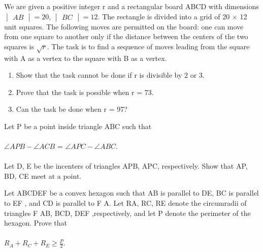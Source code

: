 \item We are given a positive integer r and a rectangular board ABCD with
dimensions $\begin{vmatrix} AB \end{vmatrix} = 20$, $\begin{vmatrix} BC \end{vmatrix} = 12$. The rectangle is divided into a grid of 20 $\times$ 12 unit squares. The following moves are permitted on the board: one can move from one square to another only if the distance between the centers of the two squares is $\sqrt{r}$. The task is to find a sequence of moves leading from the square with A as a vertex to the square with B as a vertex.
\begin{enumerate}
\item Show that the task cannot be done if r is divisible by 2 or 3.
\item Prove that the task is possible when r = 73.
\item Can the task be done when r = 97?
\end{enumerate}

\item Let P be a point inside triangle ABC such that\\
\\ $\angle APB - \angle ACB$ = $\angle APC - \angle ABC$.\\
\\ Let D, E be the incenters of triangles APB, APC, respectively. Show that AP, BD, CE meet at a point.\\

\item Let ABCDEF be a convex hexagon such that AB is parallel to DE, BC is parallel to EF , and CD is parallel to F A. Let RA, RC, RE denote the circumradii of triangles F AB, BCD, DEF ,respectively, and let P denote the perimeter of the hexagon. Prove that\\
\\ $R_A + R_C + R_E \geq \frac{P}{2}$.


